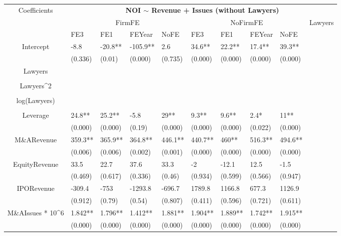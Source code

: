 \documentclass{article}
\begin{document}
\begin{table}[H]
\centering
\begin{tabular}{|clllllllll|}
\hline
\multirow{3}{*}{Coefficients} & \multicolumn{9}{c|}{\textbf{NOI $\sim$ Revenue + Issues (without Lawyers)}} \\
\cline{2-10}
& \multicolumn{4}{c}{FirmFE} & \multicolumn{4}{c}{NoFirmFE} & \multirow{2}{*}{Lawyers} \\
\cline{2-9}
& FE3 & FE1 & FEYear & NoFE & FE3 & FE1 & FEYear & NoFE &  \\
\hline
 
Intercept & -8.8 & -20.8** & -105.9** & 2.6 & 34.6** & 22.2** & 17.4** & 39.3** & \\ 
   & (0.336) & (0.01) & (0.000) & (0.735) & (0.000) & (0.000) & (0.000) & (0.000) & \\ 
  Lawyers &  &  &  &  &  &  &  &  & \\ 
   &  &  &  &  &  &  &  &  & \\ 
  Lawyers^2 &  &  &  &  &  &  &  &  & \\ 
   &  &  &  &  &  &  &  &  & \\ 
  log(Lawyers) &  &  &  &  &  &  &  &  & \\ 
   &  &  &  &  &  &  &  &  & \\ 
  Leverage & 24.8** & 25.2** & -5.8 & 29** & 9.3** & 9.6** & 2.4* & 11** & \\ 
   & (0.000) & (0.000) & (0.19) & (0.000) & (0.000) & (0.000) & (0.022) & (0.000) & \\ 
  M\&ARevenue & 359.3** & 365.9** & 364.8** & 446.1** & 440.7** & 460** & 516.3** & 494.6** & \\ 
   & (0.006) & (0.006) & (0.002) & (0.001) & (0.000) & (0.000) & (0.000) & (0.000) & \\ 
  EquityRevenue & 33.5 & 22.7 & 37.6 & 33.3 & -2 & -12.1 & 12.5 & -1.5 & \\ 
   & (0.469) & (0.617) & (0.336) & (0.46) & (0.934) & (0.599) & (0.566) & (0.947) & \\ 
  IPORevenue & -309.4 & -753 & -1293.8 & -696.7 & 1789.8 & 1166.8 & 677.3 & 1126.9 & \\ 
   & (0.912) & (0.79) & (0.54) & (0.807) & (0.411) & (0.596) & (0.721) & (0.611) & \\ 
  M\&AIssues * 10^6 & 1.842** & 1.796** & 1.412** & 1.881** & 1.904** & 1.889** & 1.742** & 1.915** & \\ 
   & (0.000) & (0.000) & (0.000) & (0.000) & (0.000) & (0.000) & (0.000) & (0.000) & \\ 

\end{tabular}
\end{table}
\end{document}
